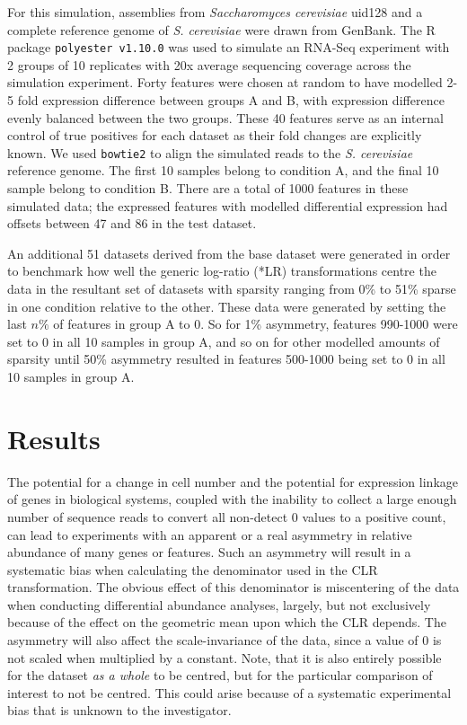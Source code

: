 \documentclass[graybox]{svmult}
\begin{document}
For this simulation, assemblies from \textit{Saccharomyces cerevisiae} uid128 and  a complete reference genome of \textit{S. cerevisiae} were drawn from GenBank. The R package \texttt{polyester v1.10.0} \cite{polyester:2016} was used to simulate an RNA-Seq experiment with 2 groups of 10 replicates with 20x average sequencing coverage across the simulation experiment. Forty features were chosen at random to have modelled 2-5 fold expression difference between groups A and B, with expression difference evenly balanced between the two groups. These 40 features serve as an internal control of true positives for each dataset as their fold changes are explicitly known. We used \texttt{bowtie2} \cite{bowtie2} to align the simulated reads  to the \textit{S. cerevisiae} reference genome. The first 10 samples belong to condition A, and the final 10 sample belong to condition B. There are a total of 1000 features in these simulated data; the expressed features with modelled differential expression had  offsets between 47 and 86 in the test dataset. 

An additional 51 datasets derived from the base dataset were generated in order to benchmark how well the generic log-ratio (*LR) transformations centre the data in the resultant set of datasets with sparsity ranging from 0\% to 51\% sparse in one condition relative to the other. These data were generated by setting the last $n \%$ of features in group A to 0. So for 1\% asymmetry, features 990-1000 were set to 0 in all 10 samples in group A, and so on for other modelled amounts of sparsity until 50\% asymmetry resulted in features 500-1000 being set to 0 in all 10 samples in group A. 


\section*{Results}
\label{sec:2}

The potential for a change in cell number and the potential for expression linkage of genes in biological systems, coupled with the inability to collect a large enough number of sequence reads to convert all non-detect 0 values to a positive count, can lead to experiments with an apparent or a real asymmetry in relative abundance of many genes or features. Such an asymmetry will result in a systematic bias when calculating the denominator used in the CLR transformation. The obvious effect of this denominator is miscentering of the data when conducting differential abundance analyses, largely, but not exclusively because of the effect on the geometric mean upon which the CLR depends. The asymmetry will also affect the scale-invariance of the data, since a value of 0 is not scaled when multiplied by a constant. Note, that it is also entirely possible for the dataset \textit{as a whole} to be centred, but for the particular comparison of interest to not be centred. This could arise because of a systematic experimental bias that is unknown to the investigator. 
\end{document}
